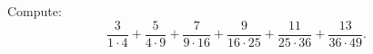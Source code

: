 Compute: \[\dfrac{3}{1\cdot4}+\dfrac{5}{4\cdot9}+\dfrac{7}{9\cdot16}+\dfrac{9}{16\cdot25}+\dfrac{11}{25\cdot36}+\dfrac{13}{36\cdot49}.\]

